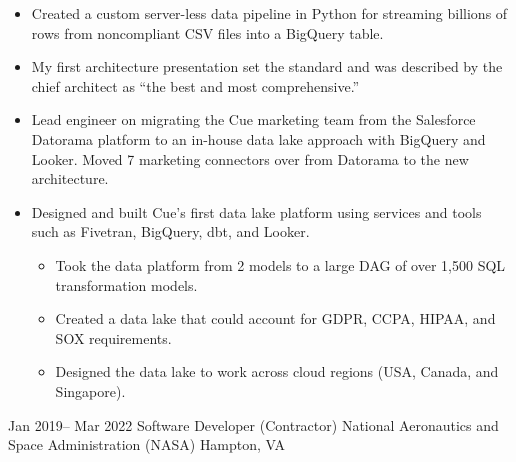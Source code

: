 \documentclass[11pt,a4paper]{moderncv}
\begin{document}
{
    \begin{itemize}
        \item{Created a custom server-less data pipeline in Python for streaming billions of rows from noncompliant CSV files into a BigQuery table.}
        \item{My first architecture presentation set the standard and was described by the chief architect as “the best and most comprehensive.”}
        \item{Lead engineer on migrating the Cue marketing team from the Salesforce Datorama platform to an in-house data lake approach with BigQuery and Looker. Moved 7 marketing connectors over from Datorama to the new architecture.}
        \item{Designed and built Cue's first data lake platform using services and tools such as Fivetran, BigQuery, dbt, and Looker.}
        \begin{itemize}
            \item{Took the data platform from 2 models to a large DAG of over 1,500 SQL transformation models.}
            \item{Created a data lake that could account for GDPR, CCPA, HIPAA, and SOX requirements.}
            \item{Designed the data lake to work across cloud regions (USA, Canada, and Singapore).}
        \end{itemize}
    \end{itemize}
}
\cventry
{Jan 2019-- Mar 2022  }
{Software Developer (Contractor)}
{National Aeronautics and Space Administration (NASA)}
{Hampton, VA}
{}
\end{document}
